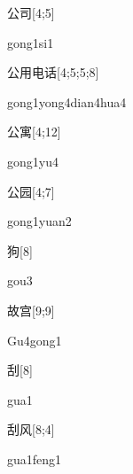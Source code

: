 \begin{verbete}[gong1si1]{公司}[4;5]
\begin{pronuncia}{gong1si1}
\end{pronuncia}
\end{verbete}

\begin{verbete}{公用电话}[4;5;5;8]
  \begin{pronuncia}[\\]{gong1yong4dian4hua4}
\end{pronuncia}
\end{verbete}

\begin{verbete}[gong1yu4]{公寓}[4;12]
\begin{pronuncia}{gong1yu4}
\end{pronuncia}
\end{verbete}

\begin{verbete}{公园}[4;7]
\begin{pronuncia}{gong1yuan2}
\end{pronuncia}
\end{verbete}

\begin{verbete}[gou3]{狗}[8]
\begin{pronuncia}{gou3}
\end{pronuncia}
\end{verbete}

\begin{verbete}[Gu4gong1]{故宫}[9;9]
\begin{pronuncia}{Gu4gong1}
\end{pronuncia}
\end{verbete}

\begin{verbete}[gua1]{刮}[8]
\begin{pronuncia}{gua1}
\end{pronuncia}
\end{verbete}

\begin{verbete}{刮风}[8;4]
\begin{pronuncia}{gua1feng1}
\end{pronuncia}
\end{verbete}

